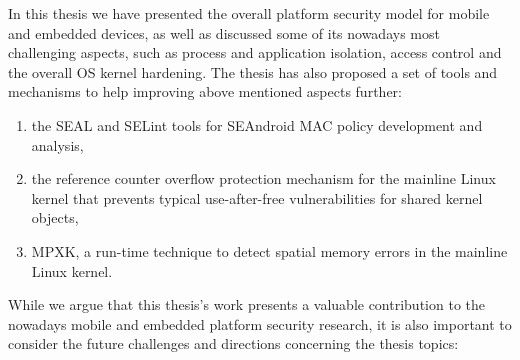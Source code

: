 
In this thesis we have presented the overall platform security model for mobile and embedded devices, as well as discussed some of its nowadays most challenging aspects, such as process and application isolation, access control and the overall OS kernel hardening.
The thesis has also proposed a set of tools and mechanisms to help improving above mentioned aspects further: 
\begin{enumerate}
	\item the SEAL and SELint tools for SEAndroid MAC policy development and analysis,
	\item the reference counter overflow protection mechanism for the mainline Linux kernel that prevents typical use-after-free vulnerabilities for shared kernel objects,
	\item MPXK, a run-time technique to detect spatial memory errors in the mainline Linux kernel. 
\end{enumerate}

While we argue that this thesis's work presents a valuable contribution to the nowadays mobile and embedded platform security research, it is also important to consider the future challenges and directions concerning the thesis topics:

